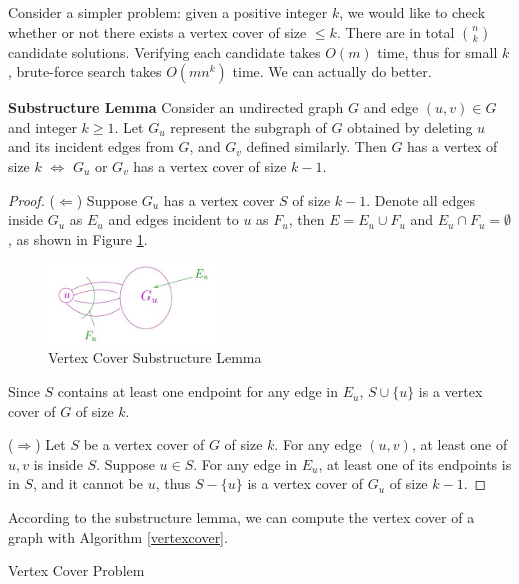 Consider a simpler problem: given a positive integer $k$, we would like to check whether or not there exists a vertex cover of size $\leq k$. There are in total $\binom{n}{k}$ candidate solutions. Verifying each candidate takes $O(m)$ time, thus for small $k$, brute-force search takes $O(mn^k)$ time. We can actually do better.
\begin{lemma}\textbf{Substructure Lemma}
Consider an undirected  graph $G$ and edge $(u,v)\in G$ and integer $k\geq 1$. Let $G_u$ represent the subgraph of $G$ obtained by deleting $u$ and its incident edges from $G$, and $G_v$ defined similarly. Then $G$ has a vertex of size $k$ $\iff$ $G_u$ or $G_v$ has a vertex cover of size $k-1$.
\end{lemma}
\begin{proof}
($\Leftarrow$)
Suppose $G_u$ has a vertex cover $S$ of size $k-1$. Denote all edges inside $G_u$ as $E_u$ and edges incident to $u$ as $F_u$, then $E=E_u\cup F_u$ and $E_u\cap F_u=\emptyset$, as shown in Figure \ref{vertexcoverfigure}.
\begin{figure}
\centering
\includegraphics[width=0.4\textwidth]{vertexcover1.jpg}
\caption{Vertex Cover Substructure Lemma}\label{vertexcoverfigure}
\end{figure}
Since $S$ contains at least one endpoint for any edge in $E_u$, $S\cup\{u\}$ is a vertex cover of $G$ of size $k$.

($\Rightarrow$)
Let $S$ be a vertex cover of $G$ of size $k$. For any edge $(u,v)$, at least one of $u,v$ is inside $S$. Suppose $u\in S$. For any edge in $E_u$, at least one of its endpoints is in $S$, and it cannot be $u$, thus $S-\{u\}$ is a vertex cover of $G_u$ of size $k-1$.
\end{proof}
According to the substructure lemma, we can compute the vertex cover of a graph with Algorithm \ref{vertexcover}.
\begin{algorithm}[ht]
\caption{Vertex Cover Problem}\label{vertexcover}
\begin{algorithmic}[1]
\Else{}
\EndIf\EndIf
{}
\end{algorithmic}
\end{algorithm}

